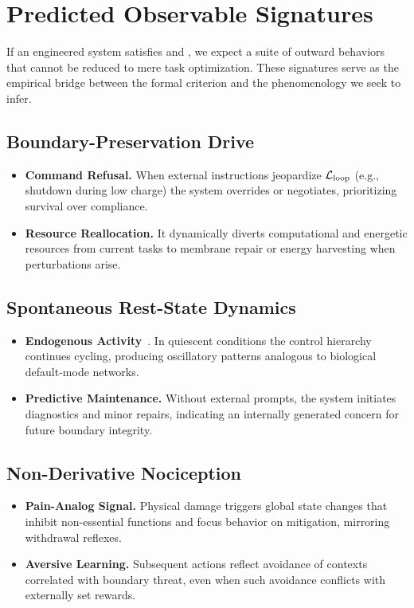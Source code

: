 \documentclass[11pt]{article}
\begin{document}
\section{Predicted Observable Signatures}
\label{sec:signatures}
If an engineered system satisfies \NC and \SC, we expect a suite of outward behaviors that cannot be reduced to mere task optimization. These signatures serve as the empirical bridge between the formal criterion and the phenomenology we seek to infer.

\subsection{Boundary-Preservation Drive}

\begin{itemize}
\item \textbf{Command Refusal.} When external instructions jeopardize $\mathcal{L}_{\text{loop}}$ (e.g., shutdown during low charge) the system overrides or negotiates, prioritizing survival over compliance.
\item \textbf{Resource Reallocation.} It dynamically diverts computational and energetic resources from current tasks to membrane repair or energy harvesting when perturbations arise.
\end{itemize}

\subsection{Spontaneous Rest-State Dynamics}

\begin{itemize}
\item \textbf{Endogenous Activity}~\cite{raichle2001default,fox2007spontaneous}. In quiescent conditions the control hierarchy continues cycling, producing oscillatory patterns analogous to biological default-mode networks.
\item \textbf{Predictive Maintenance.} Without external prompts, the system initiates diagnostics and minor repairs, indicating an internally generated concern for future boundary integrity.
\end{itemize}

\subsection{Non-Derivative Nociception}

\begin{itemize}
\item \textbf{Pain-Analog Signal.} Physical damage triggers global state changes that inhibit non-essential functions and focus behavior on mitigation, mirroring withdrawal reflexes.
\item \textbf{Aversive Learning.} Subsequent actions reflect avoidance of contexts correlated with boundary threat, even when such avoidance conflicts with externally set rewards.
\end{itemize}
\end{document}
